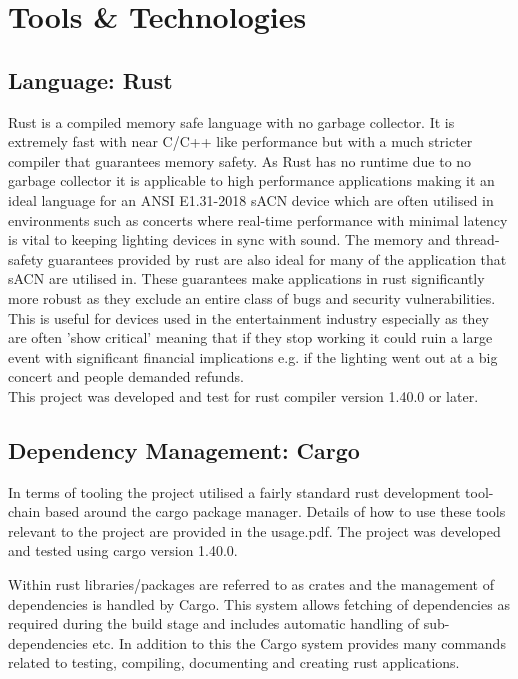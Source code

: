\documentclass[11pt,a4paper]{article}
\begin{document}
\section{Tools \& Technologies}
\subsection{Language: Rust}
Rust \cite{RUST_LANG} is a compiled memory safe language with no garbage collector. It is extremely fast with near C/C++ like performance \cite{RUST_C_COMPARISON} but with a much stricter compiler that guarantees memory safety. As Rust has no runtime due to no garbage collector it is applicable to high performance applications making it an ideal language for an ANSI E1.31-2018 sACN device which are often utilised in environments such as concerts where real-time performance with minimal latency is vital to keeping lighting devices in sync with sound. The memory and thread-safety guarantees provided by rust are also ideal for many of the application that sACN are utilised in. These guarantees make applications in rust significantly more robust as they exclude an entire class of bugs and security vulnerabilities. This is useful for devices used in the entertainment industry especially as they are often 'show critical' meaning that if they stop working it could ruin a large event with significant financial implications e.g. if the lighting went out at a big concert and people demanded refunds.\\

This project was developed and test for rust compiler version 1.40.0 or later.

\subsection{Dependency Management: Cargo}
In terms of tooling the project utilised a fairly standard rust development tool-chain based around the cargo package manager. Details of how to use these tools relevant to the project are provided in the usage.pdf. The project was developed and tested using cargo version 1.40.0.

Within rust libraries/packages are referred to as crates and the management of dependencies is handled by Cargo. This system allows fetching of dependencies as required during the build stage and includes automatic handling of sub-dependencies etc. In addition to this the Cargo system provides many commands related to testing, compiling, documenting and creating rust applications.
\end{document}
